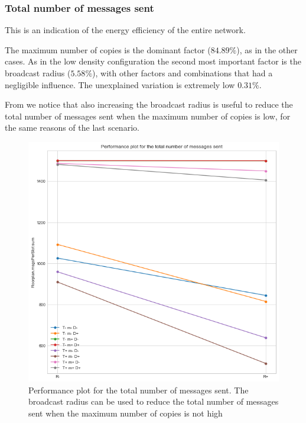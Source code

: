 \subsubsection{Total number of messages sent}\label{subsubsec:rect2krmessages}

This is an indication of the energy efficiency of the entire network.

The maximum number of copies is the dominant factor (\(84.89\%\)), as in the
other cases. As in the low density configuration the second most important
factor is the broadcast radius (\(5.58\%\)), with other factors and combinations
that had a negligible influence. The unexplained variation is extremely low
\(0.31\%\).

From  we notice that also increasing the broadcast
radius is useful to reduce the total number of messages sent when the maximum
number of copies is low, for the same reasons of the last scenario.

\begin{figure}[htb]
	\centering
	\includegraphics[width=\textwidth]{img/rect/messages_R_perfplot.png}
	\caption{Performance plot for the total number of messages sent. The
	broadcast radius can be used to reduce the total number of messages sent
	when the maximum number of copies is not
	high}\label{fig:rectperfmessagesR}
\end{figure}
